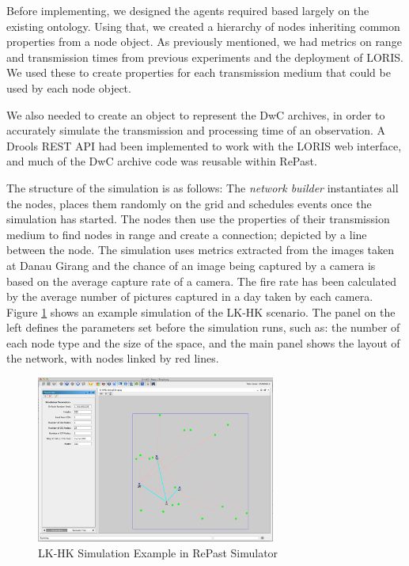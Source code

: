 Before implementing, we designed the agents required based largely on the existing ontology. Using that, we created a hierarchy of nodes inheriting common properties from a node object. As previously mentioned, we had metrics on range and transmission times from previous experiments and the deployment of LORIS. We used these to create properties for each transmission medium that could be used by each node object.

We also needed to create an object to represent the DwC archives, in order to accurately simulate the transmission and processing time of an observation. A Drools REST API had been implemented to work with the LORIS web interface, and much of the DwC archive code was reusable within RePast. 

The structure of the simulation is as follows: The \textit{network builder} instantiates all the nodes, places them randomly on the grid and schedules events once the simulation has started. The nodes then use the properties of their transmission medium to find nodes in range and create a connection; depicted by a line between the node. The simulation uses metrics extracted from the images taken at Danau Girang and the chance of an image being captured by a camera is based on the average capture rate of a camera. The fire rate has been calculated by the average number of pictures captured in a day taken by each camera. Figure \ref{fig:sim} shows an example simulation of the LK-HK scenario. The panel on the left defines the parameters set before the simulation runs, such as: the number of each node type and the size of the space, and the main panel shows the layout of the network, with nodes linked by red lines.


	\begin{figure}[h]
	\centering
	\includegraphics[width=0.70\textwidth]{Chap7/figures/khas_sim}
	\caption{LK-HK Simulation Example in RePast Simulator}
	\label{fig:sim}
	\end{figure}


